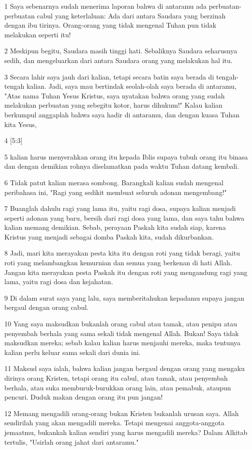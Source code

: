 \par 1 Saya sebenarnya sudah menerima laporan bahwa di antaramu ada perbuatan-perbuatan cabul yang keterlaluan: Ada dari antara Saudara yang berzinah dengan ibu tirinya. Orang-orang yang tidak mengenal Tuhan pun tidak melakukan seperti itu!
\par 2 Meskipun begitu, Saudara masih tinggi hati. Sebaliknya Saudara seharusnya sedih, dan mengeluarkan dari antara Saudara orang yang melakukan hal itu.
\par 3 Secara lahir saya jauh dari kalian, tetapi secara batin saya berada di tengah-tengah kalian. Jadi, saya mau bertindak seolah-olah saya berada di antaramu, "Atas nama Tuhan Yesus Kristus, saya nyatakan bahwa orang yang sudah melakukan perbuatan yang sebegitu kotor, harus dihukum!" Kalau kalian berkumpul anggaplah bahwa saya hadir di antaramu, dan dengan kuasa Tuhan kita Yesus,
\par 4 [5:3]
\par 5 kalian harus menyerahkan orang itu kepada Iblis supaya tubuh orang itu binasa dan dengan demikian rohnya diselamatkan pada waktu Tuhan datang kembali.
\par 6 Tidak patut kalian merasa sombong. Barangkali kalian sudah mengenal peribahasa ini, "Ragi yang sedikit membuat seluruh adonan mengembang!"
\par 7 Buanglah dahulu ragi yang lama itu, yaitu ragi dosa, supaya kalian menjadi seperti adonan yang baru, bersih dari ragi dosa yang lama, dan saya tahu bahwa kalian memang demikian. Sebab, perayaan Paskah kita sudah siap, karena Kristus yang menjadi sebagai domba Paskah kita, sudah dikurbankan.
\par 8 Jadi, mari kita merayakan pesta kita itu dengan roti yang tidak beragi, yaitu roti yang melambangkan kemurnian dan semua yang berkenan di hati Allah. Jangan kita merayakan pesta Paskah itu dengan roti yang mengandung ragi yang lama, yaitu ragi dosa dan kejahatan.
\par 9 Di dalam surat saya yang lalu, saya memberitahukan kepadamu supaya jangan bergaul dengan orang cabul.
\par 10 Yang saya maksudkan bukanlah orang cabul atau tamak, atau penipu atau penyembah berhala yang sama sekali tidak mengenal Allah. Bukan! Saya tidak maksudkan mereka; sebab kalau kalian harus menjauhi mereka, maka tentunya kalian perlu keluar sama sekali dari dunia ini.
\par 11 Maksud saya ialah, bahwa kalian jangan bergaul dengan orang yang mengaku dirinya orang Kristen, tetapi orang itu cabul, atau tamak, atau penyembah berhala, atau suka memburuk-burukkan orang lain, atau pemabuk, ataupun pencuri. Duduk makan dengan orang itu pun jangan!
\par 12 Memang mengadili orang-orang bukan Kristen bukanlah urusan saya. Allah sendirilah yang akan mengadili mereka. Tetapi mengenai anggota-anggota jemaatmu, bukankah kalian sendiri yang harus mengadili mereka? Dalam Alkitab tertulis, "Usirlah orang jahat dari antaramu."

